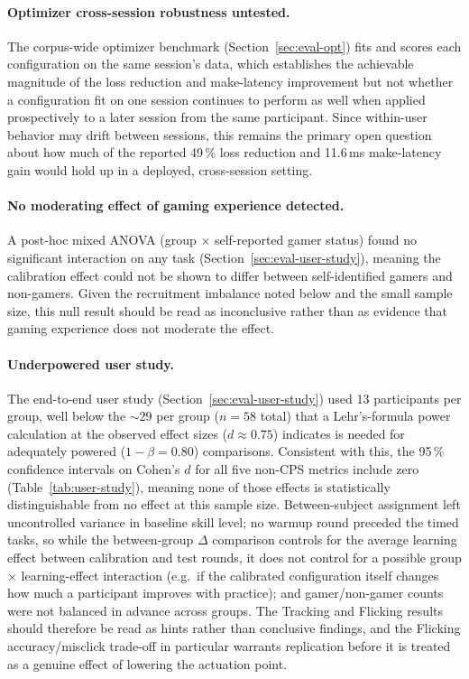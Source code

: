 \paragraph{Optimizer cross-session robustness untested.}
The corpus-wide optimizer benchmark (Section~\ref{sec:eval-opt}) fits and scores
each configuration on the same session's data, which establishes the achievable
magnitude of the loss reduction and make-latency improvement but not whether a
configuration fit on one session continues to perform as well when applied
prospectively to a later session from the same participant. Since within-user
behavior may drift between sessions, this remains the primary open question
about how much of the reported 49\,\% loss reduction and 11.6\,ms make-latency
gain would hold up in a deployed, cross-session setting.

\paragraph{No moderating effect of gaming experience detected.}
A post-hoc mixed ANOVA (group $\times$ self-reported gamer status) found no
significant interaction on any task (Section~\ref{sec:eval-user-study}), meaning
the calibration effect could not be shown to differ between self-identified
gamers and non-gamers. Given the recruitment imbalance noted below and the small
sample size, this null result should be read as inconclusive rather than as
evidence that gaming experience does not moderate the effect.

\paragraph{Underpowered user study.}
The end-to-end user study (Section~\ref{sec:eval-user-study}) used 13 participants
per group, well below the $\sim$29 per group ($n=58$ total) that a Lehr's-formula
power calculation at the observed effect sizes ($d\approx0.75$) indicates is
needed for adequately powered ($1-\beta=0.80$) comparisons. Consistent with this,
the 95\,\% confidence intervals on Cohen's $d$ for all five non-CPS metrics
include zero (Table~\ref{tab:user-study}), meaning none of those effects is
statistically distinguishable from no effect at this sample size. Between-subject assignment left
uncontrolled variance in baseline skill level; no warmup round preceded the timed
tasks, so while the between-group $\Delta$ comparison controls for the average
learning effect between calibration and test rounds, it does not control for a
possible group $\times$ learning-effect interaction (e.g.\ if the calibrated
configuration itself changes how much a participant improves with practice);
and gamer/non-gamer counts were not balanced in
advance across groups. The Tracking and Flicking results should therefore be read
as hints rather than conclusive findings, and the Flicking accuracy/misclick
trade-off in particular warrants replication before it is treated as a genuine
effect of lowering the actuation point.

